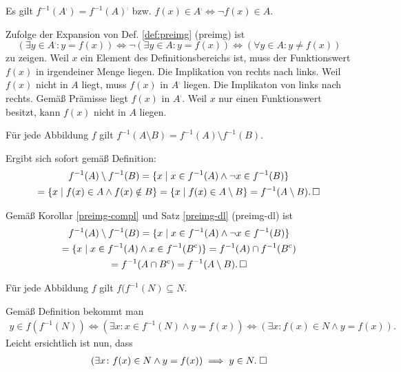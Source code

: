 \begin{Korollar}\label{preimg-compl}
Es gilt $f^{-1}(A^\comp)=f^{-1}(A)^\comp$ bzw.
$f(x)\in A^\comp\Leftrightarrow \neg f(x)\in A$.
\end{Korollar}
\begin{Beweis} Zufolge der Expansion von Def. \ref{def:preimg} (preimg) ist
\[(\exists y\in A^\comp\colon y=f(x))\iff \neg (\exists y\in A\colon y=f(x))
\iff (\forall y\in A\colon y\ne f(x))\]
zu zeigen. Weil $x$ ein Element des Definitionsbereichs ist, muss
der Funktionswert $f(x)$ in irgendeiner Menge liegen. Die Implikation
von rechts nach links. Weil $f(x)$ nicht in $A$ liegt, muss $f(x)$
in $A^\comp$ liegen. Die Implikaton von links nach rechts.
Gemäß Prämisse liegt $f(x)$ in $A^\comp$. Weil $x$ nur einen
Funktionswert besitzt, kann $f(x)$ nicht in $A$ liegen.\,\qedsymbol
\end{Beweis}

\begin{Satz}\label{preimg-setminus}
Für jede Abbildung $f$ gilt
$f^{-1}(A\setminus B) = f^{-1}(A)\setminus f^{-1}(B)$.
\end{Satz}
\begin{Beweis}[Beweis 1] Ergibt sich sofort gemäß Definition:
\begin{gather*}
f^{-1}(A)\setminus f^{-1}(B) = \{x\mid x\in f^{-1}(A)\land \neg x\in f^{-1}(B)\}\\
= \{x\mid f(x)\in A\land f(x)\notin B\}
= \{x\mid f(x)\in A\setminus B\}
= f^{-1}(A\setminus B).\,\square
\end{gather*}
\end{Beweis}
\begin{Beweis}[Beweis 2] Gemäß Korollar \ref{preimg-compl} und Satz
\ref{preimg-dl} (preimg-dl) ist
\begin{gather*}
f^{-1}(A)\setminus f^{-1}(B) = \{x\mid x\in f^{-1}(A)\land \neg x\in f^{-1}(B)\}\\
= \{x\mid x\in f^{-1}(A)\land x\in f^{-1}(B^\mathrm c)\}
= f^{-1}(A)\cap f^{-1}(B^\mathrm c)\\
= f^{-1}(A\cap B^\mathrm c) = f^{-1}(A\setminus B).\,\square
\end{gather*}
\end{Beweis}

\begin{Satz}\label{img-preimg}
Für jede Abbildung $f$ gilt $f(f^{-1}(N)\subseteq N$.
\end{Satz}
\begin{Beweis}
Gemäß Definition bekommt man
\begin{gather*}
y\in f(f^{-1}(N))
\iff (\exists x\colon x\in f^{-1}(N)\land y=f(x))
\iff (\exists x\colon f(x)\in N\land y=f(x)).
\end{gather*}
Leicht ersichtlich ist nun, dass
\begin{gather*}
(\exists x\colon f(x)\in N\land y=f(x)) \implies y\in N.\;\square
\end{gather*}
\end{Beweis}


